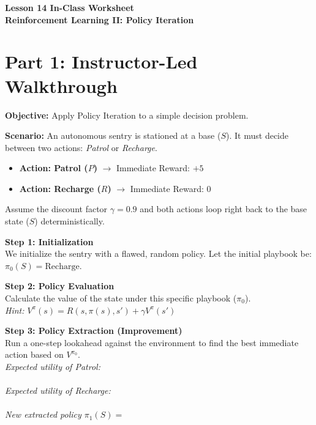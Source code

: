 \documentclass[12pt]{article}
\begin{document}
\begin{center}
    \LARGE \textbf{Lesson 14 In-Class Worksheet}\\
    \Large \textbf{Reinforcement Learning II: Policy Iteration}
\end{center}
\vspace{0.5cm}

\section*{Part 1: Instructor-Led Walkthrough}
\textbf{Objective:} Apply Policy Iteration to a simple decision problem.

\noindent \textbf{Scenario:} An autonomous sentry is stationed at a base ($S$). It must decide between two actions: \textit{Patrol} or \textit{Recharge}.
\begin{itemize}
    \item \textbf{Action: Patrol ($P$)} $\rightarrow$ Immediate Reward: $+5$
    \item \textbf{Action: Recharge ($R$)} $\rightarrow$ Immediate Reward: $0$
\end{itemize}
\noindent Assume the discount factor $\gamma = 0.9$ and both actions loop right back to the base state ($S$) deterministically.

\vspace{0.5cm}
\noindent \textbf{Step 1: Initialization}\\
We initialize the sentry with a flawed, random policy. Let the initial playbook be:\\
$\pi_0(S) = \text{Recharge}$.
\vspace{1cm}

\noindent \textbf{Step 2: Policy Evaluation}\\
Calculate the value of the state under this specific playbook ($\pi_0$).\\
\textit{Hint: $V^{\pi}(s) = R(s, \pi(s), s') + \gamma V^{\pi}(s')$}\\
\vspace{3cm}

\noindent \textbf{Step 3: Policy Extraction (Improvement)}\\
Run a one-step lookahead against the environment to find the best immediate action based on $V^{\pi_0}$.\\
\textit{Expected utility of Patrol:}\\
\vspace{1.5cm}\\
\textit{Expected utility of Recharge:}\\
\vspace{1.5cm}\\
\textit{New extracted policy $\pi_1(S) = $}\\
\vspace{1cm}
\end{document}
